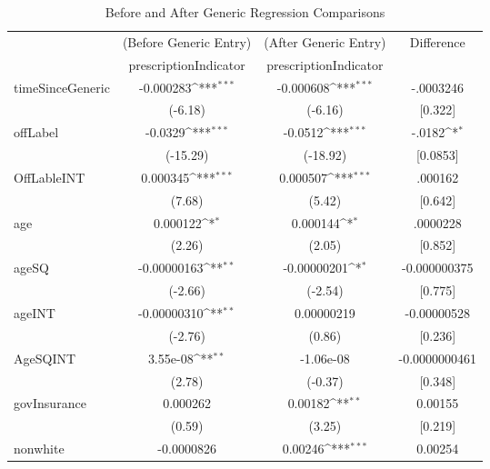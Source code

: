 \begin{table}[htbp]\centering
\def\sym#1{\ifmmode^{#1}\else\(^{#1}\)\fi}
\caption{Before and After Generic Regression Comparisons\label{tab1}}
\begin{tabular}{l*{3}{c}}
\hline\hline
            &\multicolumn{1}{c}{(Before Generic Entry)}&\multicolumn{1}{c}{(After Generic Entry)}&\multicolumn{1}{c}{Difference}\\
            &\multicolumn{1}{c}{prescriptionIndicator}&\multicolumn{1}{c}{prescriptionIndicator}&\multicolumn{1}{c}{}\\
\hline
timeSinceGeneric&   -0.000283\sym{***}&   -0.000608\sym{***}&   -.0003246\\
            &     (-6.18)         &     (-6.16)         &     [0.322]         \\
[1em]
offLabel    &     -0.0329\sym{***}&     -0.0512\sym{***}&   -.0182\sym{*}\\
            &    (-15.29)         &    (-18.92)         &    [0.0853]         \\
[1em]
OffLableINT &    0.000345\sym{***}&    0.000507\sym{***}&   .000162\\
            &      (7.68)         &      (5.42)         &    [0.642]         \\
[1em]
age         &    0.000122\sym{*}  &    0.000144\sym{*}  &   .0000228\\
            &      (2.26)         &      (2.05)         &    [0.852]         \\
[1em]
ageSQ       & -0.00000163\sym{**} & -0.00000201\sym{*}  &   -0.000000375\\
            &     (-2.66)         &     (-2.54)         &    [0.775]         \\
[1em]
ageINT      & -0.00000310\sym{**} &  0.00000219         &   -0.00000528\\
            &     (-2.76)         &      (0.86)         &    [0.236]         \\
[1em]
AgeSQINT    &    3.55e-08\sym{**} &   -1.06e-08         &   -0.0000000461\\
            &      (2.78)         &     (-0.37)         &    [0.348]         \\
[1em]
govInsurance&    0.000262         &     0.00182\sym{**} &   0.00155\\
            &      (0.59)         &      (3.25)         &    [0.219]         \\
[1em]
nonwhite    &  -0.0000826         &     0.00246\sym{***}&   0.00254\\

\end{tabular}
\end{table}
